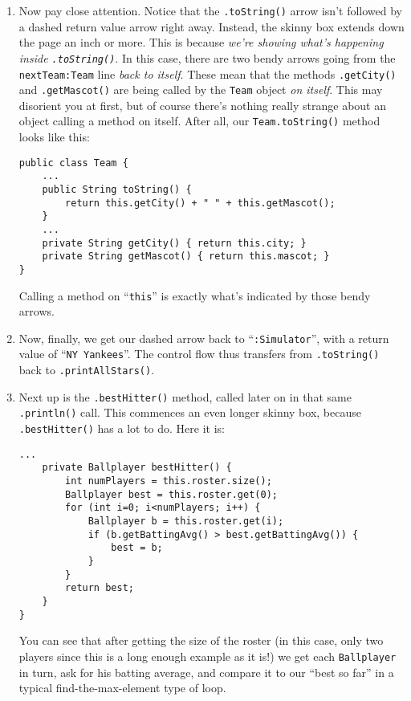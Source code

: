 \begin{enumerate}
\item Now pay close attention. Notice that the \texttt{.toString()} arrow
isn't followed by a dashed return value arrow right away. Instead, the skinny
box extends down the page an inch or more. This is because \textit{we're
showing what's happening inside \texttt{.toString()}}. In this case, there are
two bendy arrows going from the \texttt{nextTeam:Team} line \textit{back to
itself}. These mean that the methods \texttt{.getCity()} and
\texttt{.getMascot()} are being called by the \texttt{Team} object \textit{on
itself}. This may disorient you at first, but of course there's nothing really
strange about an object calling a method on itself. After all, our
\texttt{Team.toString()} method looks like this:

\begin{Verbatim}[fontsize=\footnotesize,samepage=true,frame=single]
public class Team {
    ...
    public String toString() {
        return this.getCity() + " " + this.getMascot();
    }
    ...
    private String getCity() { return this.city; }
    private String getMascot() { return this.mascot; }
}
\end{Verbatim}

Calling a method on ``\texttt{this}'' is exactly what's indicated by those
bendy arrows.

\item Now, finally, we get our dashed arrow back to ``\texttt{:Simulator}'',
with a return value of ``\texttt{NY Yankees}''. The control flow thus transfers
from \texttt{.toString()} back to \texttt{.printAllStars()}.

\item Next up is the \texttt{.bestHitter()} method, called later on in that
same \texttt{.println()} call. This commences an even longer skinny box,
because \texttt{.bestHitter()} has a lot to do. Here it is:

\begin{Verbatim}[fontsize=\scriptsize,samepage=true,frame=single]
    ...
    private Ballplayer bestHitter() {
        int numPlayers = this.roster.size();
        Ballplayer best = this.roster.get(0);
        for (int i=0; i<numPlayers; i++) {
            Ballplayer b = this.roster.get(i);
            if (b.getBattingAvg() > best.getBattingAvg()) {
                best = b;
            }
        }
        return best;
    }
}
\end{Verbatim}

You can see that after getting the size of the roster (in this case, only two
players since this is a long enough example as it is!) we get each
\texttt{Ballplayer} in turn, ask for his batting average, and compare it to
our ``best so far'' in a typical find-the-max-element type of loop.


\end{enumerate}
